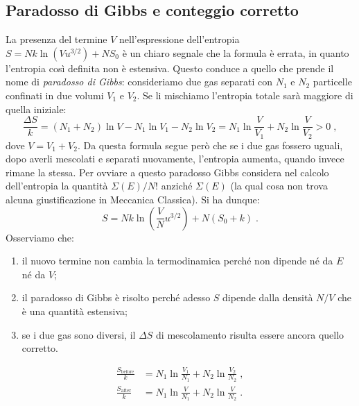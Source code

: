 \documentclass[10pt,a4paper]{report}
\theoremstyle{definition}
\numberwithin{equation}{section}
\begin{document}
\subsection{Paradosso di Gibbs e conteggio corretto}
La presenza del termine $V$ nell'espressione dell'entropia $S=Nk\ln(Vu^{3/2})+NS_0$ è un chiaro segnale che la formula è errata, in quanto l'entropia così definita non è estensiva. Questo conduce a quello che prende il nome di \emph{paradosso di Gibbs}: consideriamo due gas separati con $N_1$ e $N_2$ particelle confinati in due volumi $V_1$ e $V_2$. Se li mischiamo l'entropia totale sarà maggiore di quella iniziale:
$$
\frac{\Delta S}{k}=(N_1+N_2)\ln V-N_1\ln V_1-N_2\ln V_2=N_1\ln\frac{V}{V_1}+N_2\ln \frac{V}{V_2}>0\;,
$$
dove $V=V_1+V_2$. Da questa formula segue però che se i due gas fossero uguali, dopo averli mescolati e separati nuovamente, l'entropia aumenta, quando invece rimane la stessa. Per ovviare a questo paradosso Gibbs considera nel calcolo dell'entropia la quantità $\Sigma(E)/N!$ anziché $\Sigma(E)$ (la qual cosa non trova alcuna giustificazione in Meccanica Classica). Si ha dunque:
\begin{equation}
S=Nk\ln\left(\frac{V}{N}u^{3/2}\right)+N(S_0+k)\;.
\end{equation}
Osserviamo che:
\begin{enumerate}
\item il nuovo termine non cambia la termodinamica perché non dipende né da $E$ né da $V$;
\item il paradosso di Gibbs è risolto perché adesso $S$ dipende dalla densità $N/V$ che è una quantità estensiva;
\item se i due gas sono diversi, il $\Delta S$ di mescolamento risulta essere ancora quello corretto.
\end{enumerate}
\begin{align*}
\frac{S_{\mathrm{before}}}{k}&=N_1\ln\frac{V_1}{N_1}+N_2\ln\frac{V_2}{N_2}\;, \\
\frac{S_{\mathrm{after}}}{k}&=N_1\ln\frac{V}{N_1}+N_2\ln\frac{V}{N_2}\;.
\end{align*}
\end{document}
